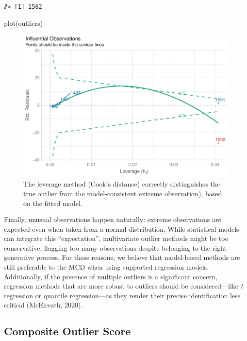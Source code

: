 \documentclass{article}
\newenvironment{Shaded}{\begin{snugshade}}{\end{snugshade}}
\newcommand{\FunctionTok}[1]{\textcolor[rgb]{0.00,0.00,0.00}{#1}}
\newcommand{\NormalTok}[1]{#1}
\begin{document}
\begin{verbatim}
#> [1] 1502
\end{verbatim}

\begin{Shaded}
\begin{Highlighting}[]
\FunctionTok{plot}\NormalTok{(outliers)}
\end{Highlighting}
\end{Shaded}

\begin{figure}
\includegraphics[width=1\linewidth]{paper_files/figure-latex/model2-1} \caption{The leverage method (Cook's distance) correctly distinguishes the true outlier from the model-consistent extreme observation), based on the fitted model.}\label{fig:model2}
\end{figure}

Finally, unusual observations happen naturally: extreme observations are
expected even when taken from a normal distribution. While statistical
models can integrate this ``expectation'', multivariate outlier methods
might be too conservative, flagging too many observations despite
belonging to the right generative process. For these reasons, we believe
that model-based methods are still preferable to the MCD when using
supported regression models. Additionally, if the presence of multiple
outliers is a significant concern, regression methods that are more
robust to outliers should be considered---like \emph{t} regression or
quantile regression---as they render their precise identification less
critical (McElreath, 2020).

\hypertarget{composite-outlier-score}{%
\subsection{Composite Outlier Score}\label{composite-outlier-score}}
\end{document}
